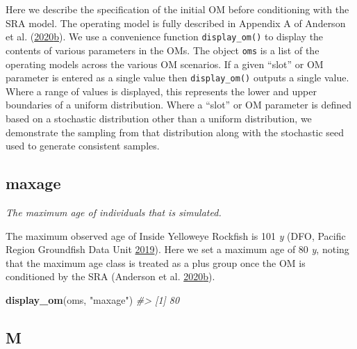 \documentclass[11pt]{book}
\newenvironment{Shaded}{}{}
\newcommand{\KeywordTok}[1]{\textcolor[rgb]{0.00,0.44,0.13}{\textbf{{#1}}}}
\newcommand{\StringTok}[1]{\textcolor[rgb]{0.25,0.44,0.63}{{#1}}}
\newcommand{\CommentTok}[1]{\textcolor[rgb]{0.38,0.63,0.69}{\textit{{#1}}}}
\newcommand{\NormalTok}[1]{{#1}}
\begin{document}
\label{app:desc-om-yelloweye}

Here we describe the specification of the initial OM before conditioning with the SRA model. The operating model is fully described in Appendix A of Anderson et al. (\protect\hyperlink{ref-anderson2020gfmp}{2020}\protect\hyperlink{ref-anderson2020gfmp}{b}). We use a convenience function \texttt{display\_om()} to display the contents of various parameters in the OMs. The object \texttt{oms} is a list of the operating models across the various OM scenarios. If a given ``slot'' or OM parameter is entered as a single value then \texttt{display\_om()} outputs a single value. Where a range of values is displayed, this represents the lower and upper boundaries of a uniform distribution. Where a ``slot'' or OM parameter is defined based on a stochastic distribution other than a uniform distribution, we demonstrate the sampling from that distribution along with the stochastic seed used to generate consistent samples.

\label{app:desc-stock-yelloweye}

\label{app:desc-stock-maxage-yelloweye}
\subsection{maxage}

\emph{The maximum age of individuals that is simulated.}

The maximum observed age of Inside Yelloweye Rockfish is 101 \emph{y} (DFO, Pacific Region Groundfish Data Unit \protect\hyperlink{ref-databases2019}{2019}). Here we set a maximum age of 80 \emph{y}, noting that the maximum age class is treated as a plus group once the OM is conditioned by the SRA (Anderson et al. \protect\hyperlink{ref-anderson2020gfmp}{2020}\protect\hyperlink{ref-anderson2020gfmp}{b}).
\begin{Shaded}
\begin{Highlighting}[]
\KeywordTok{display_om}\NormalTok{(oms, }\StringTok{"maxage"}\NormalTok{)}
\CommentTok{#> [1] 80}
\end{Highlighting}
\end{Shaded}
\label{app:desc-stock-m-yelloweye}
\subsection{M}
\end{document}

